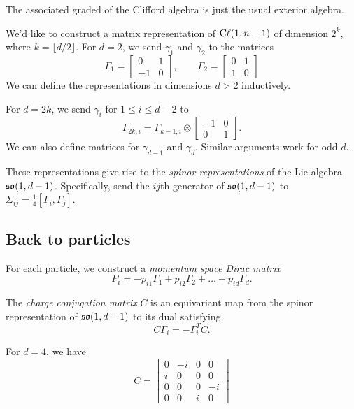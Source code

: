 \documentclass{amsart}
\begin{document}
\begin{rmk}
	The associated graded of the Clifford algebra is just the usual exterior algebra.
\end{rmk}

We'd like to construct a matrix representation of $\operatorname{C\ell}(1, n-1)$ of dimension $2^k$, where $k = \lfloor d / 2 \rfloor$.
For $d = 2$, we send $\gamma_1$ and $\gamma_2$ to the matrices
\[
	\Gamma_1 = \begin{bmatrix}0 & 1 \\ -1 & 0 \end{bmatrix}, \hspace{2em} \Gamma_2 = \begin{bmatrix}0 & 1 \\ 1 & 0\end{bmatrix}
\]
We can define the representations in dimensions $d > 2$ inductively.

For $d = 2k$, we send $\gamma_i$ for $1 \leq i \leq d-2$ to
\[
	\Gamma_{2k,i} = \Gamma_{k-1,i} \otimes \begin{bmatrix}-1 & 0 \\ 0 & 1\end{bmatrix}.
\]
We can also define matrices for $\gamma_{d-1}$ and $\gamma_d$.
Similar arguments work for odd $d$.

These representations give rise to the \emph{spinor representations} of the Lie algebra $\mathfrak{so}(1, d-1)$.
Specifically, send the $ij$th generator of $\mathfrak{so}(1, d-1)$ to $\Sigma_{ij} = \frac{1}{4} [\Gamma_i, \Gamma_j]$.

\subsection{Back to particles}

For each particle, we construct a \emph{momentum space Dirac matrix}
\[
	P_i = -p_{i1} \Gamma_1 + p_{i2} \Gamma_2 + \dots + p_{id} \Gamma_d.
\]

\begin{dfn}
	The \emph{charge conjugation matrix} $C$ is an equivariant map from the spinor representation of $\mathfrak{so}(1, d-1)$ to its dual satisfying
	\[
		C \Gamma_i = -\Gamma_i^T C.
	\]
\end{dfn}

\begin{ex}
	For $d = 4$, we have
	\[
		C = \begin{bmatrix}
			0 & -i & 0 & 0 \\
			i & 0 & 0 & 0 \\
			0 & 0 & 0 & -i \\
			0 & 0 & i & 0
		\end{bmatrix}
	\]
\end{ex}
\end{document}

